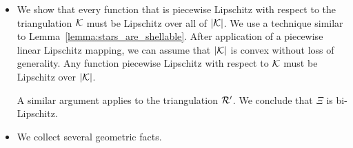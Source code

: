 \documentclass[10pt,a4paper]{article}
\begin{document}
\begin{itemize}
        \item 
        \color{red}
        We show that every function that is piecewise Lipschitz with respect to the triangulation ${\mathcal K}$ must be Lipschitz over all of $|{\mathcal K}|$. 
        We use a technique similar to Lemma~\ref{lemma:stars_are_shellable}. 
        After application of a piecewise linear Lipschitz mapping, 
        we can assume that $|{\mathcal K}|$ is convex without loss of generality. 
        Any function piecewise Lipschitz with respect to ${\mathcal K}$ must be Lipschitz over $|{\mathcal K}|$. 
        
        A similar argument applies to the triangulation ${\mathcal R}'$. 
        We conclude that $\Xi$ is bi-Lipschitz. 
        \color{black}
        
        \item 
        \color{red}
        We collect several geometric facts. 
        

\end{itemize}
\end{document}
